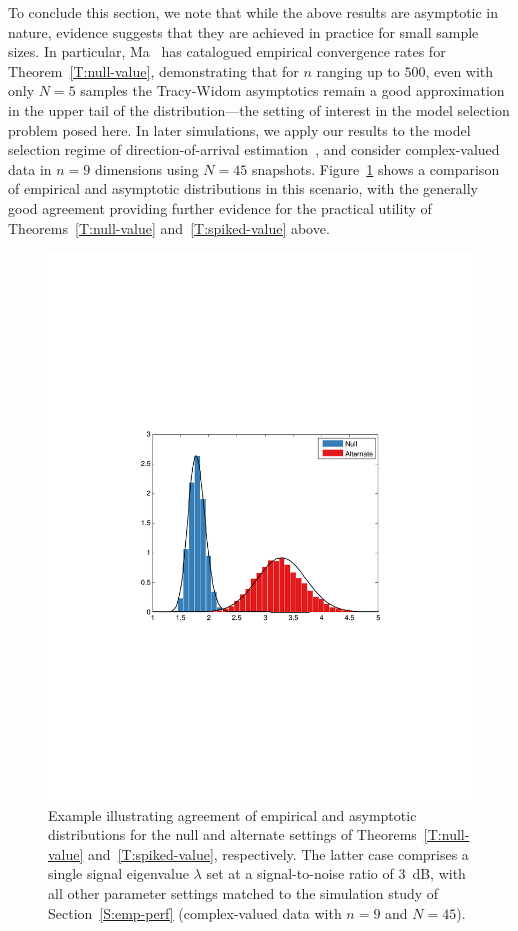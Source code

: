\documentclass[final]{IEEEtran}
\begin{document}
To conclude this section, we note that while the above results are asymptotic in nature, evidence suggests that they are achieved in practice for small sample sizes.  In particular, Ma~\cite{ma2008atw} has catalogued empirical convergence rates for Theorem~\ref{T:null-value}, demonstrating that for $n$ ranging up to $500$, even with only $N=5$ samples the Tracy-Widom asymptotics remain a good approximation in the upper tail of the distribution---the setting of interest in the model selection problem posed here.  In later simulations, we apply our results to the model selection regime of direction-of-arrival estimation~\cite{kavcic1996are}, and consider complex-valued data in $n=9$ dimensions using $N=45$ snapshots.  Figure~\ref{F:null-alt-density} shows a comparison of empirical and asymptotic distributions in this scenario, with the generally good agreement providing further evidence for the practical utility of Theorems~\ref{T:null-value} and~\ref{T:spiked-value} above.
\begin{figure}[t]
    \centering
    \includegraphics[width=\columnwidth]{plots/rank-est-dists}
    \caption{\label{F:null-alt-density}Example illustrating agreement of empirical and asymptotic distributions for the null and alternate settings of Theorems~\ref{T:null-value} and~\ref{T:spiked-value}, respectively.  The latter case comprises a single signal eigenvalue $\lambda$ set at a signal-to-noise ratio of 3~dB, with all other parameter settings matched to the simulation study of Section~\ref{S:emp-perf} (complex-valued data with $n=9$ and $N=45$).
    }
\end{figure}
\end{document}
